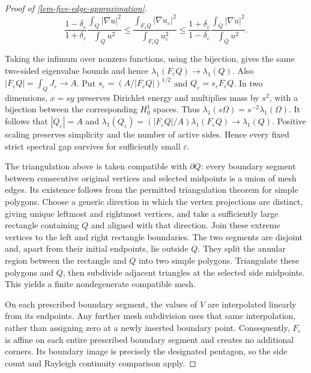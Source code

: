 \documentclass[11pt,a4paper]{article}
\theoremstyle{proofmanuscript}
\begin{document}
\begin{proof}[Proof of \ref{lem-five-edge-approximation}]
\[
\frac{1-\delta_\varepsilon}{1+\delta_\varepsilon}
\frac{\int_Q|\nabla u|^2}{\int_Qu^2}
\le \frac{\int_{F_\varepsilon Q}|\nabla u_\varepsilon|^2}{\int_{F_\varepsilon Q}u_\varepsilon^2}
\le \frac{1+\delta_\varepsilon}{1-\delta_\varepsilon}
\frac{\int_Q|\nabla u|^2}{\int_Qu^2}.
\]

Taking the infimum over nonzero functions, using the bijection, gives the same two-sided eigenvalue bounds and hence \(\lambda_1(F_\varepsilon Q)\to\lambda_1(Q)\). Also \(|F_\varepsilon Q|=\int_QJ_\varepsilon\to A\). Put \(s_\varepsilon=(A/|F_\varepsilon Q|)^{1/2}\) and \(Q_\varepsilon=s_\varepsilon F_\varepsilon Q\). In two dimensions, \(x=sy\) preserves Dirichlet energy and multiplies mass by \(s^2\), with a bijection between the corresponding \(H_0^1\) spaces. Thus \(\lambda_1(s\Omega)=s^{-2}\lambda_1(\Omega)\). It follows that \(|Q_\varepsilon|=A\) and \(\lambda_1(Q_\varepsilon)=(|F_\varepsilon Q|/A)\lambda_1(F_\varepsilon Q)\to\lambda_1(Q)\). Positive scaling preserves simplicity and the number of active sides. Hence every fixed strict spectral gap survives for sufficiently small \(\varepsilon\).

The triangulation above is taken compatible with \(\partial Q\): every boundary segment between consecutive original vertices and selected midpoints is a union of mesh edges. Its existence follows from the permitted triangulation theorem for simple polygons. Choose a generic direction in which the vertex projections are distinct, giving unique leftmost and rightmost vertices, and take a sufficiently large rectangle containing \(Q\) and aligned with that direction. Join these extreme vertices to the left and right rectangle boundaries. The two segments are disjoint and, apart from their initial endpoints, lie outside \(Q\). They split the annular region between the rectangle and \(Q\) into two simple polygons. Triangulate these polygons and \(Q\), then subdivide adjacent triangles at the selected side midpoints. This yields a finite nondegenerate compatible mesh.

On each prescribed boundary segment, the values of \(V\) are interpolated linearly from its endpoints. Any further mesh subdivision uses that same interpolation, rather than assigning zero at a newly inserted boundary point. Consequently, \(F_\varepsilon\) is affine on each entire prescribed boundary segment and creates no additional corners. Its boundary image is precisely the designated pentagon, so the side count and Rayleigh continuity comparison apply.

\end{proof}
\end{document}
